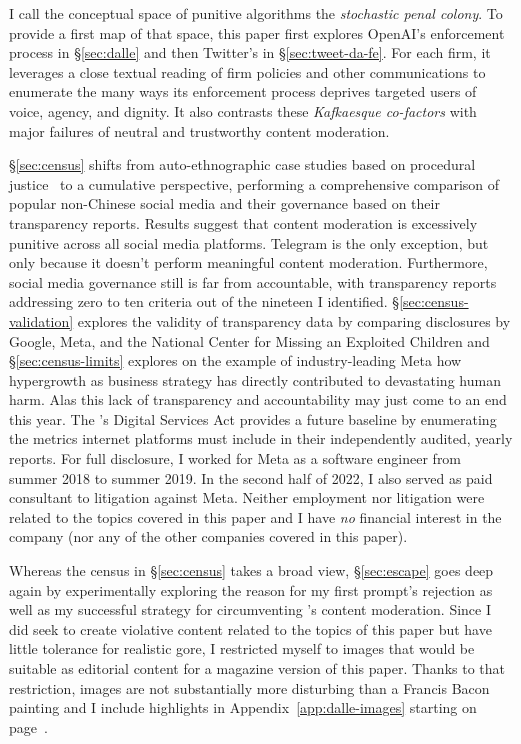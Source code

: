 I call the conceptual space of punitive algorithms the \emph{stochastic penal
colony}. To provide a first map of that space, this paper first explores
OpenAI's enforcement process in \S\ref{sec:dalle} and then Twitter's in
\S\ref{sec:tweet-da-fe}. For each firm, it leverages a close textual reading of
firm policies and other communications to enumerate the many ways its
enforcement process deprives targeted users of voice, agency, and dignity. It
also contrasts these \emph{Kafkaesque co-factors} with major failures of neutral
and trustworthy content moderation.

\S\ref{sec:census} shifts from auto-ethnographic case studies based on
procedural justice~\cite{Tyler2003,Tyler2006,Tyler2007} to a cumulative
perspective, performing a comprehensive comparison of popular non-Chinese social
media and their governance based on their transparency reports. Results suggest
that content moderation is excessively punitive across all social media
platforms. Telegram is the only exception, but only because it doesn't perform
meaningful content moderation. Furthermore, social media governance still is far
from accountable, with transparency reports addressing zero to ten criteria out
of the nineteen I identified. \S\ref{sec:census-validation} explores the
validity of transparency data by comparing disclosures by Google, Meta, and the
National Center for Missing an Exploited Children and \S\ref{sec:census-limits}
explores on the example of industry-leading Meta how hypergrowth as business
strategy has directly contributed to devastating human harm. Alas this lack of
transparency and accountability may just come to an end this year. The 's
Digital Services Act provides a future baseline by enumerating the metrics
internet platforms must include in their independently audited, yearly reports.
For full disclosure, I worked for Meta as a software engineer from summer 2018
to summer 2019. In the second half of 2022, I also served as paid consultant to
litigation against Meta. Neither employment nor litigation were related to the
topics covered in this paper and I have \emph{no} financial interest in the
company (nor any of the other companies covered in this paper).

Whereas the census in \S\ref{sec:census} takes a broad view, \S\ref{sec:escape}
goes deep again by experimentally exploring the reason for my first prompt's
rejection as well as my successful strategy for circumventing \DALLE's content
moderation. Since I did seek to create violative content related to the topics
of this paper but have little tolerance for realistic gore, I restricted myself
to images that would be suitable as editorial content for a magazine version of
this paper. Thanks to that restriction, images are not substantially more
disturbing than a Francis Bacon painting and I include highlights in
Appendix~\ref{app:dalle-images} starting on page~\pageref{app:dalle-images}.

